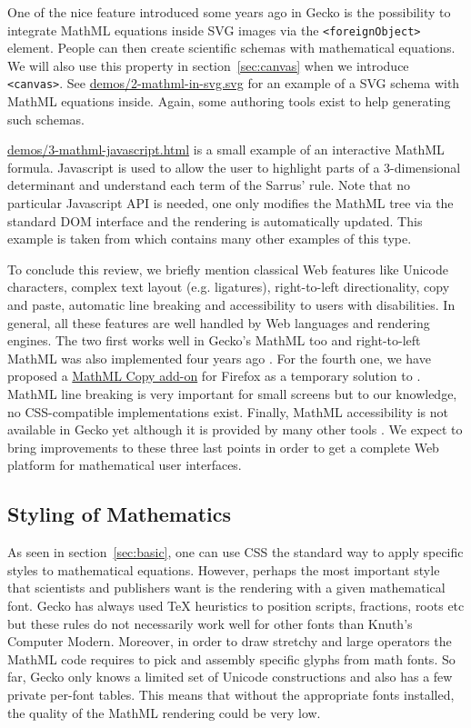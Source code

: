 One of the nice feature introduced some years ago in Gecko is the possibility
to integrate MathML equations inside SVG images via the {\tt <foreignObject>}
element. People can then create
scientific schemas with mathematical equations.
We will also use this property in section~\ref{sec:canvas}
when we introduce {\tt <canvas>}.
See \href{http://fred-wang.github.io/MathUI2014/demos/2-mathml-in-svg.svg}{demos/2-mathml-in-svg.svg} for an example of a SVG schema with
MathML equations inside. Again, some authoring tools exist to help generating
such schemas.

\href{http://fred-wang.github.io/MathUI2014/demos/3-mathml-javascript.html}{demos/3-mathml-javascript.html} is a small example of an
interactive MathML formula. Javascript is used to allow the user to highlight
parts of a 3-dimensional determinant and understand each term of the
Sarrus' rule. Note that no particular Javascript API is needed, one only
modifies the MathML tree via the standard DOM interface and the rendering
is automatically updated.
This example is taken from \cite{MathInEbooks} which contains
many other examples of this type.

To conclude this review, we briefly mention classical Web features like
Unicode characters, complex text layout (e.g. ligatures),
right-to-left directionality, copy and paste, automatic line breaking and
accessibility to users with disabilities.
In general, all these features are well handled by Web languages and rendering
engines. The two first works well in Gecko's MathML
too and right-to-left MathML was also implemented four years ago
\cite{BugzillaLTR}.
For the fourth one, we have proposed a
\href{https://addons.mozilla.org/en-US/firefox/addon/mathml-copy/}{MathML Copy add-on} for Firefox as a temporary solution to
\cite{BugzillaClipboard}. MathML line breaking \cite{BugzillaLinebreaking}
is very important
for small screens but to our knowledge, no CSS-compatible implementations exist.
Finally, MathML accessibility is not available in Gecko yet although it is
provided by many other tools \cite{BugzillaAccessibility}. We expect to
bring improvements to these three last points in order to get a complete Web
platform for mathematical user interfaces.

\subsection{Styling of Mathematics}

As seen in section~\ref{sec:basic}, one can use CSS the standard way to apply
specific styles to mathematical equations. However, perhaps the most important
style that scientists and publishers want is the rendering with a given
mathematical font. Gecko has always used TeX heuristics to position scripts,
fractions, roots etc but these rules do not necessarily work well for other
fonts than Knuth's Computer Modern. Moreover, in order to draw stretchy and
large operators the MathML code requires to pick and assembly specific glyphs
from math fonts. So far, Gecko only knows a limited set of Unicode constructions
and also has a
few private per-font tables. This means that without the appropriate
fonts installed, the quality of the MathML rendering could be very low.

